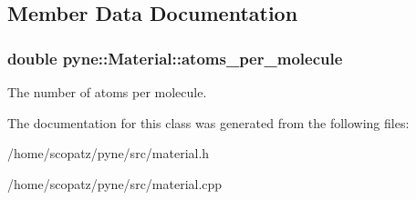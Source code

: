 \subsection{Member Data Documentation}
\hypertarget{classpyne_1_1_material_a7ddff1aaebc94bcda22d3422c093a756}{
\subsubsection[{atoms\-\_\-per\-\_\-molecule}]{\setlength{\rightskip}{0pt plus 5cm}double pyne\-::\-Material\-::atoms\-\_\-per\-\_\-molecule}}\label{classpyne_1_1_material_a7ddff1aaebc94bcda22d3422c093a756}
The number of atoms per molecule. 

The documentation for this class was generated from the following files\-:\begin{DoxyCompactItemize}
\item 
/home/scopatz/pyne/src/material.\-h\item 
/home/scopatz/pyne/src/material.\-cpp\end{DoxyCompactItemize}
